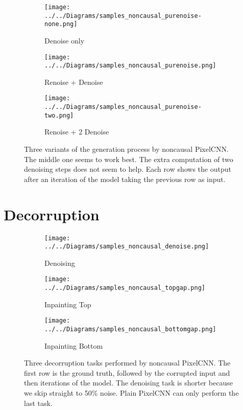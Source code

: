 \documentclass[11pt, a4paper, openany]{book}
\begin{document}
\begin{figure}
  \centering    
    \begin{subfigure}{0.32\columnwidth}
        \centering
        \caption{Denoise only}
        \texttt{[image: ../../Diagrams/samples\_noncausal\_purenoise-none.png]} 
        \label{noncausalsamples:none}
    \end{subfigure}
    \hfill
    \begin{subfigure}{0.32\columnwidth}
        \centering
        \caption{Renoise + Denoise}
        \texttt{[image: ../../Diagrams/samples\_noncausal\_purenoise.png]} 
        \label{noncausalsamples:renoise}
    \end{subfigure}
    \hfill
    \begin{subfigure}{0.32\columnwidth}
        \centering
        \caption{Renoise + 2 Denoise}
        \texttt{[image: ../../Diagrams/samples\_noncausal\_purenoise-two.png]} 
        \label{noncausalsamples:two}
    \end{subfigure}
  \caption[Generation process by noncausal PixelCNN]{Three variants of the generation process by noncausal PixelCNN. The middle one seems to work best. The extra computation of two denoising steps does not seem to help. Each row shows the output after an iteration of the model taking the previous row as input.}
  \label{noncausalsamples}
\end{figure}

\section{Decorruption}

\begin{figure}
  \centering    
    \begin{subfigure}{0.32\columnwidth}
        \centering
        \caption{Denoising}
        \texttt{[image: ../../Diagrams/samples\_noncausal\_denoise.png]} 
        \label{decorruption:denoise}
    \end{subfigure}
    \hfill
    \begin{subfigure}{0.32\columnwidth}
        \centering
        \caption{Inpainting Top}
        \texttt{[image: ../../Diagrams/samples\_noncausal\_topgap.png]} 
        \label{decorruption:topgap}
    \end{subfigure}
    \hfill
    \begin{subfigure}{0.32\columnwidth}
        \centering
        \caption{Inpainting Bottom}
        \texttt{[image: ../../Diagrams/samples\_noncausal\_bottomgap.png]} 
        \label{decorruption:bottomgap}
    \end{subfigure}
  \caption[Decorruption by noncausal PixelCNN]{Three decorruption tasks performed by noncausal PixelCNN. The first row is the ground truth, followed by the corrupted input and then iterations of the model. The denoising task is shorter because we skip straight to 50\% noise. Plain PixelCNN can only perform the last task.}
  \label{decorruption}
\end{figure}
\end{document}
